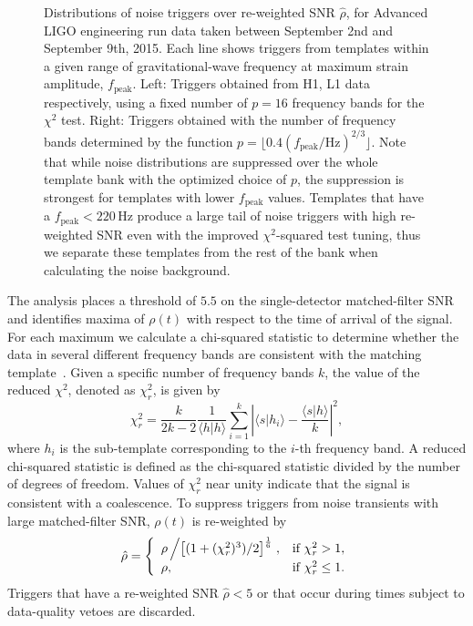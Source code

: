 \begin{figure}[t]
{ }
\caption{\label{fig:chisq_and_template_bins}
Distributions of noise triggers over re-weighted SNR $\hat{\rho}$, for
Advanced LIGO engineering run data taken between September 2nd and September 9th,
2015.  Each line shows triggers from templates within a given range of
gravitational-wave frequency at maximum strain amplitude, $f_\text{peak}$.
Left: Triggers obtained from H1, L1 data respectively, using a fixed number of
$p=16$ frequency bands for the $\chi^2$ test.  Right: Triggers obtained with
the number of frequency bands determined by the function $p=\lfloor 0.4
(f_\mathrm{peak}/\mathrm{Hz})^{2/3} \rfloor$.  Note that while noise
distributions are suppressed over the whole template bank with the optimized
choice of $p$, the suppression is strongest for templates with lower
$f_\mathrm{peak}$ values. Templates that have a $f_\text{peak} < 220\,$Hz
produce a large tail of noise triggers with high re-weighted SNR even with the
improved $\chi^2$-squared test tuning, thus we separate these templates from
the rest of the bank when calculating the noise background.
}
\end{figure}

The analysis places a threshold of $5.5$ on the single-detector matched-filter
SNR and identifies maxima of $\rho(t)$  with respect to the time of arrival of
the signal. For each maximum we calculate a chi-squared statistic to determine
whether the data in several different frequency bands are consistent with the
matching template~\cite{Allen:2004gu}. Given a specific number of frequency
bands $k$, the value of the reduced $\chi^2$, denoted as $\chi_r^2$, is given by
\begin{equation}
\chi_r^2 = \frac{k}{2k-2} \frac{1}{\langle h | h \rangle} \sum_{i=1}^k  \left|\langle s | h_i\rangle - \frac{\langle s | h\rangle}{k}\right|^2,
\label{eqn:pycbc_chisq}
\end{equation}
where $h_i$ is the sub-template corresponding to the $i$-th
frequency band.  A reduced chi-squared statistic is defined as the chi-squared statistic
divided by the number of degrees of freedom. Values of $\chi_r^2$ near unity indicate that the signal is
consistent with a coalescence. To suppress triggers from noise transients with
large matched-filter SNR, $\rho(t)$ is re-weighted
by~\cite{Colaboration:2011np,Babak:2012zx}
\begin{equation}\label{eqn:pycbc_newsnr}
\hat{\rho} = \left\{\begin{array}{lr}
\rho\left/\left[(1+(\chi^2_r)^3)/2\right]^\frac{1}{6}\right., & \text{if } \chi_r^2 > 1, \\
\rho, & \text{if } \chi_r^2 \le 1.
\end{array}\right.
\end{equation}
Triggers that have a re-weighted SNR $\hat{\rho} < 5$ or that occur during
times subject to data-quality vetoes are discarded.

